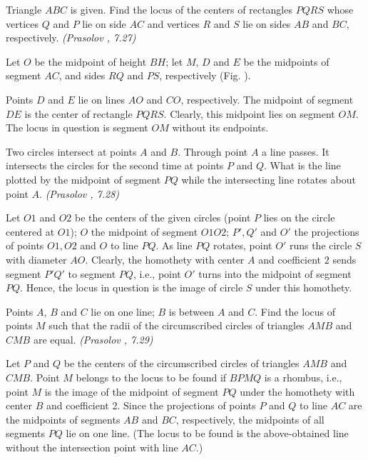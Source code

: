 \documentclass[11pt,twoside]{scrartcl}
\begin{document}
\begin{problem}
    Triangle $ABC$ is given. Find the locus of the centers of rectangles $PQRS$ whose
    vertices $Q$ and $P$ lie on side $AC$ and vertices $R$ and $S$ lie on sides $AB$ and $BC$, respectively. \textit{(Prasolov \cite{pgeo}, 7.27)}
    \begin{sketch}
    Let $O$ be the midpoint of height $BH$; let $M$, $D$ and $E$ be the midpoints of segment $AC$, and sides $RQ$ and $PS$, respectively (Fig. \TBD).

    Points $D$ and $E$ lie on lines $AO$ and $CO$, respectively. The midpoint of segment $DE$ is the center of rectangle $PQRS$. Clearly, this midpoint lies on segment $OM$. The locus in question is segment $OM$ without its endpoints.
\end{sketch}
\end{problem}

\begin{problem}
    Two circles intersect at points $A$ and $B$. Through point $A$ a line passes. It intersects the circles for the second time at points $P$ and $Q$. What is the line plotted by the midpoint of segment $PQ$ while the intersecting line rotates about point $A$. \textit{(Prasolov \cite{pgeo}, 7.28)}
    \begin{sketch}
    Let $O1$ and $O2$ be the centers of the given circles (point $P$ lies on the circle centered at $O1$); $O$ the midpoint of segment $O1O2$; $P', Q'$ and $O'$
    the projections of points $O1, O2$ and $O$ to line $P Q$. As line $P Q$ rotates, point $O'$ runs the circle $S$ with diameter $AO$. Clearly, the
    homothety with center $A$ and coefficient $2$ sends segment $P'Q'$
    to segment $P Q$, i.e., point $O'$ turns into the midpoint of segment $P Q$. Hence, the locus in question is the image of circle
    $S$ under this homothety.    
    \end{sketch}
\end{problem}

\begin{problem}
    Points $A$, $B$ and $C$ lie on one line; $B$ is between $A$ and $C$. Find the locus of points $M$ such that the radii of the circumscribed circles of triangles $AMB$ and $CMB$ are equal. \textit{(Prasolov \cite{pgeo}, 7.29)}
    \begin{sketch}
    Let $P$ and $Q$ be the centers of the circumscribed circles of triangles $AMB$ and
    $CMB$. Point $M$ belongs to the locus to be found if $BPMQ$ is a rhombus, i.e., point $M$ is the image of the midpoint of segment $P Q$ under the homothety with center $B$ and coefficient 2. Since the projections of points $P$ and $Q$ to line $AC$ are the midpoints of segments $AB$ and $BC$, respectively, the midpoints of all segments $PQ$ lie on one line. (The locus to be found is the above-obtained line without the intersection point with line $AC$.)    
    \end{sketch}
\end{problem}
\end{document}
